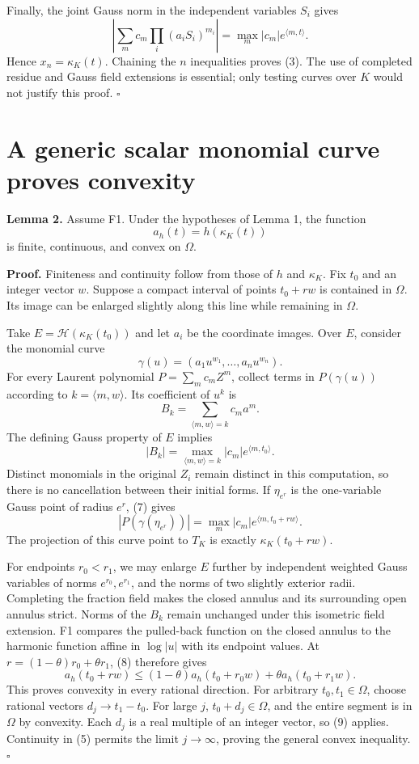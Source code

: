 \documentclass[11pt]{article}
\begin{document}
Finally, the joint Gauss norm in the independent variables \(S_i\) gives
\[
\left|\sum_m c_m\prod_i(a_iS_i)^{m_i}\right|
=\max_m|c_m|e^{\langle m,t\rangle}.
\]
Hence \(x_n=\kappa_K(t)\). Chaining the \(n\) inequalities proves (3). The use of completed residue and Gauss field extensions is essential; only testing curves over \(K\) would not justify this proof. \(\square\)

\section{A generic scalar monomial curve proves convexity}

\textbf{Lemma 2.} Assume F1. Under the hypotheses of Lemma 1, the function
\[
a_h(t)=h(\kappa_K(t))
\tag{5}
\]
is finite, continuous, and convex on \(\Omega\).

\textbf{Proof.} Finiteness and continuity follow from those of \(h\) and \(\kappa_K\). Fix \(t_0\) and an integer vector \(w\). Suppose a compact interval of points \(t_0+rw\) is contained in \(\Omega\). Its image can be enlarged slightly along this line while remaining in \(\Omega\).

Take \(E=\mathcal H(\kappa_K(t_0))\) and let \(a_i\) be the coordinate images. Over \(E\), consider the monomial curve
\[
\gamma(u)=(a_1u^{w_1},\ldots,a_nu^{w_n}).
\tag{6}
\]
For every Laurent polynomial \(P=\sum_m c_mZ^m\), collect terms in \(P(\gamma(u))\) according to \(k=\langle m,w\rangle\). Its coefficient of \(u^k\) is
\[
B_k=\sum_{\langle m,w\rangle=k}c_ma^m.
\]
The defining Gauss property of \(E\) implies
\[
|B_k|=\max_{\langle m,w\rangle=k}|c_m|e^{\langle m,t_0\rangle}.
\tag{7}
\]
Distinct monomials in the original \(Z_i\) remain distinct in this computation, so there is no cancellation between their initial forms. If \(\eta_{e^r}\) is the one-variable Gauss point of radius \(e^r\), (7) gives
\[
|P(\gamma(\eta_{e^r}))|
=\max_m|c_m|e^{\langle m,t_0+rw\rangle}.
\tag{8}
\]
The projection of this curve point to \(T_K\) is exactly \(\kappa_K(t_0+rw)\).

For endpoints \(r_0<r_1\), we may enlarge \(E\) further by independent weighted Gauss variables of norms \(e^{r_0},e^{r_1}\), and the norms of two slightly exterior radii. Completing the fraction field makes the closed annulus and its surrounding open annulus strict. Norms of the \(B_k\) remain unchanged under this isometric field extension. F1 compares the pulled-back function on the closed annulus to the harmonic function affine in \(\log|u|\) with its endpoint values. At \(r=(1-\theta)r_0+\theta r_1\), (8) therefore gives
\[
a_h(t_0+rw)\leq(1-\theta)a_h(t_0+r_0w)+\theta a_h(t_0+r_1w).
\tag{9}
\]
This proves convexity in every rational direction. For arbitrary \(t_0,t_1\in\Omega\), choose rational vectors \(d_j\to t_1-t_0\). For large \(j\), \(t_0+d_j\in\Omega\), and the entire segment is in \(\Omega\) by convexity. Each \(d_j\) is a real multiple of an integer vector, so (9) applies. Continuity in (5) permits the limit \(j\to\infty\), proving the general convex inequality. \(\square\)
\end{document}
